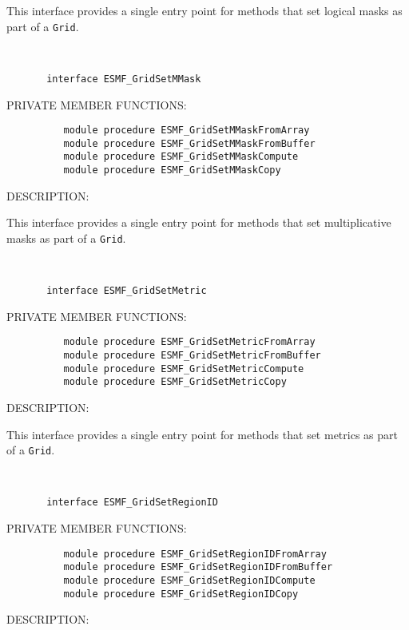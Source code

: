 {       This interface provides a single entry point for methods that set
       logical masks as part of a {\tt Grid}.
   
 
\mbox{}\hrulefill\ 
 

\begin{verbatim}       interface ESMF_GridSetMMask
 \end{verbatim}{\sf PRIVATE MEMBER FUNCTIONS:}
\begin{verbatim}          module procedure ESMF_GridSetMMaskFromArray
          module procedure ESMF_GridSetMMaskFromBuffer
          module procedure ESMF_GridSetMMaskCompute
          module procedure ESMF_GridSetMMaskCopy
 \end{verbatim}
{\sf DESCRIPTION:\\ }


       This interface provides a single entry point for methods that set
       multiplicative masks as part of a {\tt Grid}.
   
 
\mbox{}\hrulefill\ 
 

\begin{verbatim}       interface ESMF_GridSetMetric
 \end{verbatim}{\sf PRIVATE MEMBER FUNCTIONS:}
\begin{verbatim}          module procedure ESMF_GridSetMetricFromArray
          module procedure ESMF_GridSetMetricFromBuffer
          module procedure ESMF_GridSetMetricCompute
          module procedure ESMF_GridSetMetricCopy
 \end{verbatim}
{\sf DESCRIPTION:\\ }


       This interface provides a single entry point for methods that set
       metrics as part of a {\tt Grid}.
   
 
\mbox{}\hrulefill\ 
 

\begin{verbatim}       interface ESMF_GridSetRegionID
 \end{verbatim}{\sf PRIVATE MEMBER FUNCTIONS:}
\begin{verbatim}          module procedure ESMF_GridSetRegionIDFromArray
          module procedure ESMF_GridSetRegionIDFromBuffer
          module procedure ESMF_GridSetRegionIDCompute
          module procedure ESMF_GridSetRegionIDCopy
 \end{verbatim}
{\sf DESCRIPTION:\\ }


}
